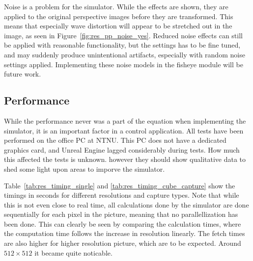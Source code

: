 Noise is a problem for the simulator. While the effects are shown, they are applied to the original perspective images before they are transformed. This means that especially wave distortion will appear to be stretched out in the image, as seen in Figure~\ref{fig:res_pp_noise_yes}. Reduced noise effects can still be applied with reasonable functionality, but the settings has to be fine tuned, and may suddenly produce unintentional artifacts, especially with random noise settings applied. Implementing these noise models in the fisheye module will be future work.

\subsection{Performance} \label{sec:res_performance}

While the performance never was a part of the equation when implementing the simulator, it is an important factor in a control application. All tests have been performed on the office PC at NTNU. This PC does not have a dedicated graphics card, and Unreal Engine lagged considerably during tests. How much this affected the tests is unknown. however they should show qualitative data to shed some light upon areas to imporve the simulator.

Table~\ref{tab:res_timing_single} and \ref{tab:res_timing_cube_capture} show the timings in seconds for different resolutions and capture types. Note that while this is not even close to real time, all calculations done by the simulator are done sequentially for each pixel in the picture, meaning that no parallellization has been done. This can clearly be seen by comparing the calculation times, where the computation time follows the increase in resolution linearly. The fetch times are also higher for higher resolution picture, which are to be expected. Around $512\times 512$ it became quite noticable. 

